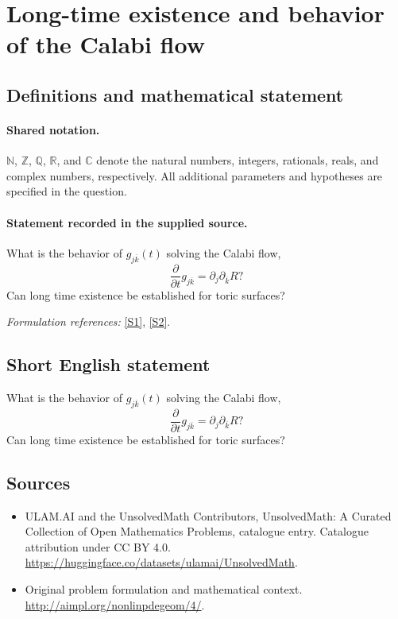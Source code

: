 \documentclass[11pt]{article}
\newcommand{\sref}[2]{\hyperlink{source:#1:#2}{[S#2]}}
\begin{document}
\section{Long-time existence and behavior of the Calabi flow}\label{statement}

\subsection{Definitions and mathematical statement}

\paragraph{Shared notation.}$\mathbb N$, $\mathbb Z$, $\mathbb Q$, $\mathbb R$, and $\mathbb C$ denote the natural numbers, integers, rationals, reals, and complex numbers, respectively. All additional parameters and hypotheses are specified in the question.


\paragraph{Statement recorded in the supplied source.}
What is the behavior of $g_{j \overline k}(t)$ solving the Calabi flow,
\[\frac \partial {\partial t} g_{j \overline k} = \partial_j \partial_{\overline k} R?\]
Can long time existence be established for toric surfaces?
\par\smallskip\textit{Formulation references:} \sref{statement}{1}, \sref{statement}{2}.
\subsection{Short English statement}
What is the behavior of $g_{j \overline k}(t)$ solving the Calabi flow,
\[\frac \partial {\partial t} g_{j \overline k} = \partial_j \partial_{\overline k} R?\]
Can long time existence be established for toric surfaces?
\subsection{Sources}
\begin{itemize}
\item[\hypertarget{source:statement:1}{S1}] ULAM.AI and the UnsolvedMath Contributors, UnsolvedMath: A Curated Collection of Open Mathematics Problems, catalogue entry. Catalogue attribution under CC BY 4.0.
\url{https://huggingface.co/datasets/ulamai/UnsolvedMath}.
\item[\hypertarget{source:statement:2}{S2}] Original problem formulation and mathematical context.
\url{http://aimpl.org/nonlinpdegeom/4/}.
\end{itemize}
\label{end:statement}
\end{document}
